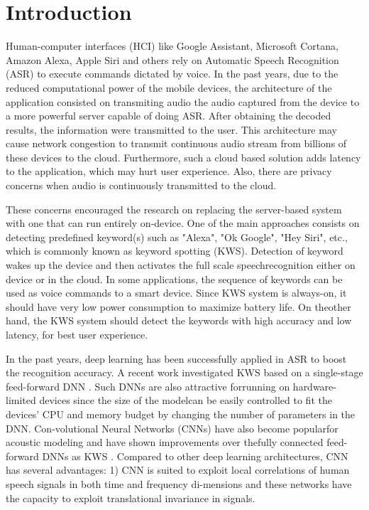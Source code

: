 
\section{Introduction}
\label{sec:introduction}

Human-computer interfaces (HCI) like Google Assistant, Microsoft Cortana, Amazon Alexa, Apple Siri and others rely on Automatic Speech Recognition (ASR) to execute commands dictated by voice. In the past years, due to the reduced computational power of the mobile devices, the architecture of the application consisted on transmiting audio the audio captured from the device to a more powerful server capable of doing ASR. After obtaining the decoded results, the information were transmitted to the user. This architecture may cause network congestion to transmit continuous audio stream from billions of these devices to the cloud. Furthermore, such a cloud based solution adds latency to the application, which may hurt user experience.  Also, there are privacy concerns when audio is continuously transmitted to the cloud. 


These concerns encouraged the research on replacing the server-based system with one that can run entirely on-device. One of the main approaches consists on detecting predefined keyword(s) such as "Alexa", "Ok Google", "Hey Siri", etc., which is commonly known as keyword spotting (KWS). Detection of keyword wakes up the device and then activates the full scale speechrecognition either on device \cite{mcgraw2016personalized} or in the cloud.  In some applications, the sequence of keywords can be used as voice commands to a smart device. Since KWS system is always-on, it should have very low power consumption to maximize battery life. On theother hand, the KWS system should detect the keywords with high accuracy and low latency, for best user experience.

In the past years, deep learning \cite{yu2014automatic} has been successfully applied in ASR to boost the recognition accuracy.  A recent work investigated KWS based on a single-stage feed-forward  DNN . Such DNNs are also attractive forrunning on hardware-limited devices since the size of the modelcan be easily controlled to fit the devices’ CPU and memory  budget by changing the number of parameters in the DNN. Con-volutional Neural Networks (CNNs) have also become popularfor acoustic modeling and have shown improvements over thefully connected feed-forward DNNs as KWS \cite{sainath2015convolutional}. Compared to other deep learning architectures, CNN has several advantages:  1) CNN is suited to exploit local correlations of  human  speech  signals  in  both  time  and  frequency  di-mensions and these networks have the capacity to exploit translational invariance in signals.


